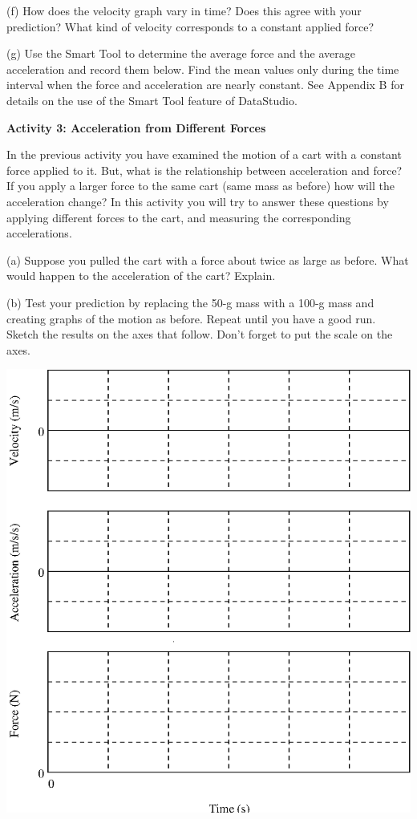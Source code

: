 (f) How does the velocity graph vary in time? Does this agree with your prediction?
What kind of velocity corresponds to a constant applied force?
\vspace{20mm}

(g) Use the Smart Tool to determine the average force and the average acceleration
and record them below. Find the mean values only during the time interval when
the force and acceleration are nearly constant. See Appendix B for details on
the use of the Smart Tool feature of DataStudio.
\vspace{20mm}

\textbf{Activity 3: Acceleration from Different Forces }

In the previous activity you have examined the motion of a cart with a constant
force applied to it. But, what is the relationship between acceleration and
force? If you apply a larger force to the same cart (same mass as before) how
will the acceleration change? In this activity you will try to answer these
questions by applying different forces to the cart, and measuring the corresponding
accelerations. 

(a) Suppose you pulled the cart with a force about twice as large as before.
What would happen to the acceleration of the cart? Explain.
\vspace{20mm}

(b) Test your prediction by replacing the 50-g mass with a 100-g mass and creating graphs of the motion as before. Repeat until you have a good run. Sketch the
results on the axes that follow. Don't forget to put the scale on the axes.

\vspace{0.3cm}
{\par\centering \includegraphics{force1_fig5.eps} \par}
\vspace{0.3cm}

